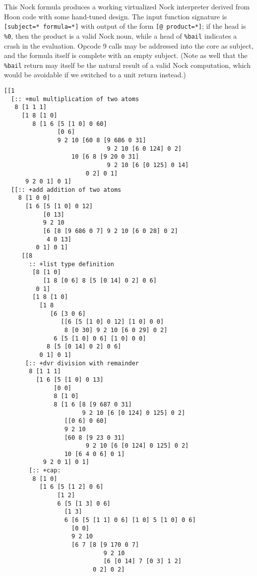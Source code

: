 \documentclass[twoside]{article}
\begin{document}
This Nock formula produces a working virtualized Nock interpreter derived from Hoon code with some hand-tuned design.  The input function signature is \lstinline[style=inlinecode]{[subject=* formula=*]} with output of the form \lstinline[style=inlinecode]{[@ product=*]}; if the head is \lstinline[style=inlinecode]{%0}, then the product is a valid Nock noun, while a head of \lstinline[style=inlinecode]{%bail} indicates a crash in the evaluation.  Opcode 9 calls may be addressed into the core as subject, and the formula itself is complete with an empty subject.  (Note as well that the \lstinline[style=inlinecode]{%bail} return may itself be the natural result of a valid Nock computation, which would be avoidable if we switched to a unit return instead.)

\begin{lstlisting}[style=listingcode]
[[1
  [:: +mul multiplication of two atoms
   8 [1 1 1]
     [1 8 [1 0]
        8 [1 6 [5 [1 0] 0 60]
               [0 6]
               9 2 10 [60 8 [9 686 0 31]
                             9 2 10 [6 0 124] 0 2]
                   10 [6 8 [9 20 0 31]
                             9 2 10 [6 [0 125] 0 14]
                       0 2] 0 1]
      9 2 0 1] 0 1]
  [[:: +add addition of two atoms
    8 [1 0 0]
      [1 6 [5 [1 0] 0 12]
           [0 13]
           9 2 10
           [6 [8 [9 686 0 7] 9 2 10 [6 0 28] 0 2]
            4 0 13]
         0 1] 0 1]
     [[8
       :: +list type definition
        [8 [1 0]
           [1 8 [0 6] 8 [5 [0 14] 0 2] 0 6]
         0 1]
        [1 8 [1 0]
          [1 8
             [6 [3 0 6]
                [[6 [5 [1 0] 0 12] [1 0] 0 0]
                 8 [0 30] 9 2 10 [6 0 29] 0 2]
              6 [5 [1 0] 0 6] [1 0] 0 0]
            8 [5 [0 14] 0 2] 0 6]
          0 1] 0 1]
      [:: +dvr division with remainder
       8 [1 1 1]
         [1 6 [5 [1 0] 0 13]
              [0 0]
              8 [1 0]
              8 [1 6 [8 [9 687 0 31]
                      9 2 10 [6 [0 124] 0 125] 0 2]
                 [[0 6] 0 60]
                 9 2 10
                 [60 8 [9 23 0 31]
                       9 2 10 [6 [0 124] 0 125] 0 2]
                 10 [6 4 0 6] 0 1]
           9 2 0 1] 0 1]
       [:: +cap: 
        8 [1 0]
          [1 6 [5 [1 2] 0 6]
               [1 2]
               6 [5 [1 3] 0 6]
                 [1 3]
                 6 [6 [5 [1 1] 0 6] [1 0] 5 [1 0] 0 6]
                   [0 0]
                   9 2 10
                   [6 7 [8 [9 170 0 7]
                            9 2 10
                            [6 [0 14] 7 [0 3] 1 2]
                         0 2] 0 2]

\end{lstlisting}
\end{document}
